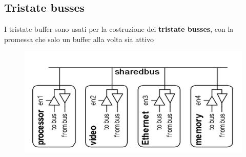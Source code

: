 \documentclass{report}
\begin{document}
    \subsection{Tristate busses}
        I tristate buffer sono usati per la costruzione dei \textbf{tristate busses},
        con la promessa che solo un buffer alla volta sia attivo
        \begin{center}
            \begin{figure}[H]
                \includegraphics[width=\textwidth]{tristatebusses.png}
            \end{figure}
        \end{center}         
\end{document}
